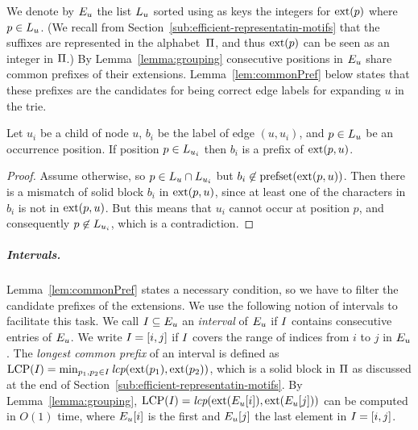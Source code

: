 We denote by $E_{u}$ the list $L_{u}$ sorted using as keys the integers for $\operatorname{ext}(p)$ where $p \in L_{u}$. (We recall from Section~\ref{sub:efficient-representatin-motifs} that the suffixes are represented in the alphabet~$\Pi$, and thus $\operatorname{ext}(p)$ can be seen as an integer in $\Pi$.) By Lemma~\ref{lemma:grouping} consecutive positions in $E_{u}$ share common prefixes of their extensions. Lemma~\ref{lem:commonPref} below states that these prefixes are the candidates for being correct edge labels for expanding $u$ in the trie. 
\begin{lemma}
  \label{lem:commonPref}
    Let $u_i$ be a child of node $u$, $b_i$ be the label of  edge $(u, u_i)$, and $p \in L_{u}$ be an occurrence position. If position $p \in L_{u_i}$ then $b_i$ is a prefix of $\operatorname{ext}(p, u)$.
\end{lemma}
\begin{proof}
    Assume otherwise, so $p \in L_{u} \cap L_{u_i}$ but $b_i \not \in \operatorname{prefset}(\operatorname{ext}(p, u))$. 
    Then there is a mismatch of solid block $b_i$ in $\operatorname{ext}(p, u)$, since at least one of the characters in $b_i$ is not in $\operatorname{ext}(p, u)$. But this means that $u_i$ cannot occur at position $p$, and consequently $p \not \in L_{u_i}$, which is a contradiction.
\end{proof}

\subparagraph*{Intervals.}
%
Lemma~\ref{lem:commonPref} states a necessary condition, so we have to filter the candidate prefixes of the extensions. We use the following notion of intervals to facilitate this task. We call $I_{} \subseteq E_{u}$ an \emph{interval} of $E_{u}$ if $I_{}$ contains consecutive entries of $E_{u}$. We write $I_{} = [i, j]$ if $I_{}$ covers the range of indices from $i$ to $j$ in $E_{u}$. 
The \emph{longest common prefix} of an interval is defined as $\operatorname{LCP}(I_{}) = \min_{p_1, p_2 \in I_{}} \operatorname{\textit{lcp}}(\operatorname{ext}(p_1), \operatorname{ext}(p_2))$, which is a solid block in $\Pi$ as discussed at the end of Section~\ref{sub:efficient-representatin-motifs}. By Lemma~\ref{lemma:grouping}, $\operatorname{LCP}(I_{}) = \operatorname{\textit{lcp}}(\operatorname{ext}(E_{u}[i]), \operatorname{ext}(E_{u}[j]))$ can be computed in $O(1)$ time, where $E_{u}[i]$ is the first and $E_{u}[j]$ the last element in $I_{} = [i, j]$. 

